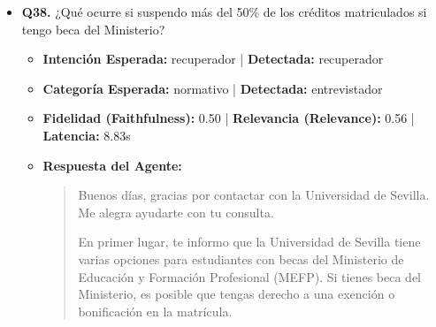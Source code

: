 \documentclass[12pt,a4paper,oneside]{report}
\begin{document}
\begin{itemize}
  
\item \textbf{Q38.} ¿Qué ocurre si suspendo más del 50\% de los créditos matriculados si tengo beca del Ministerio? \\
        \begin{itemize}
          \item \textbf{Intención Esperada:} recuperador | \textbf{Detectada:} recuperador
          \item \textbf{Categoría Esperada:} normativo | \textbf{Detectada:} entrevistador
          \item \textbf{Fidelidad (Faithfulness):} 0.50 | \textbf{Relevancia (Relevance):} 0.56 | \textbf{Latencia:} 8.83s
          \item \textbf{{Respuesta del Agente:}} \\
                \begin{quote}
Buenos días, gracias por contactar con la Universidad de Sevilla. Me alegra ayudarte con tu consulta. 

En primer lugar, te informo que la Universidad de Sevilla tiene varias opciones para estudiantes con becas del Ministerio de Educación y Formación Profesional (MEFP). Si tienes beca del Ministerio, es posible que tengas derecho a una exención o bonificación en la matrícula. 


\end{quote}
\end{itemize}
\end{itemize}
\end{document}

